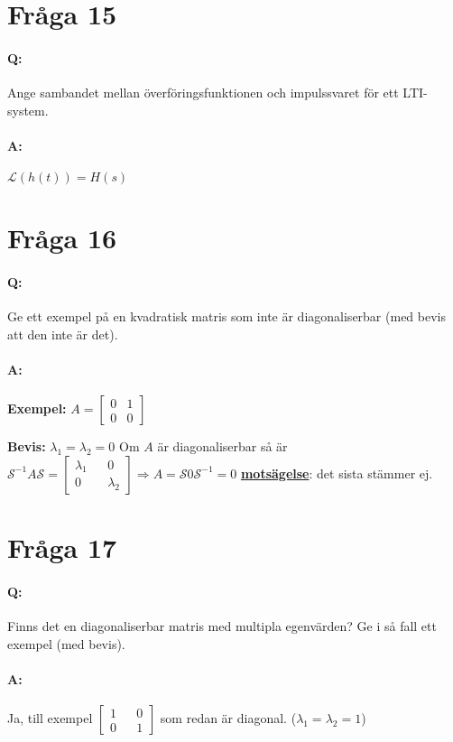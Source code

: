 \documentclass[a4paper]{article}
\begin{document}
\section{Fråga 15}
\paragraph{Q:} Ange sambandet mellan överföringsfunktionen och impulssvaret för ett LTI-system.
\paragraph{A:} $\mathcal{L}(h(t)) = H(s)$ 

\section{Fråga 16}
\paragraph{Q:} Ge ett exempel på en kvadratisk matris som inte är diagonaliserbar (med bevis att den inte är det).
\paragraph{A:} \textbf{Exempel:} { \center
$A=
\begin{bmatrix}
0 & 1 \\
0 & 0
\end{bmatrix}
$ \center }

\textbf{Bevis:} $\lambda_1=\lambda_2=0$ Om $A$ är diagonaliserbar så är $\mathcal{S}^{-1}A\mathcal{S} = 
\begin{bmatrix}
\lambda_1 && 0 \\
0 && \lambda_2
\end{bmatrix}
\Rightarrow
A=\mathcal{S}0\mathcal{S}^{-1}=0$ \underline{\textbf{motsägelse}}: det sista stämmer ej.

\section{Fråga 17}
\paragraph{Q:} Finns det en diagonaliserbar matris med multipla egenvärden? Ge i så fall ett exempel (med bevis). 
\paragraph{A:} Ja, till exempel $\begin{bmatrix} 1 && 0 \\ 0 && 1 \end{bmatrix}$ som redan är diagonal. ($\lambda_1=\lambda_2=1$)
\end{document}
